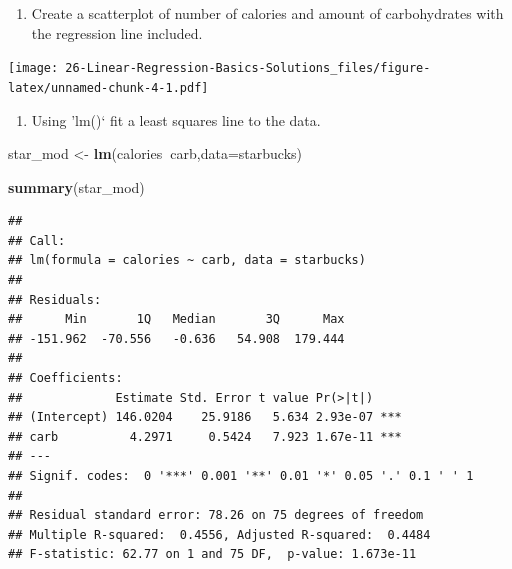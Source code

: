 \documentclass[
]{book}
\newenvironment{Shaded}{\begin{snugshade}}{\end{snugshade}}
\newcommand{\DataTypeTok}[1]{\textcolor[rgb]{0.13,0.29,0.53}{#1}}
\newcommand{\KeywordTok}[1]{\textcolor[rgb]{0.13,0.29,0.53}{\textbf{#1}}}
\newcommand{\NormalTok}[1]{#1}
\newcommand{\OperatorTok}[1]{\textcolor[rgb]{0.81,0.36,0.00}{\textbf{#1}}}
\newcommand{\StringTok}[1]{\textcolor[rgb]{0.31,0.60,0.02}{#1}}
\providecommand{\tightlist}{%
  \setlength{\itemsep}{0pt}\setlength{\parskip}{0pt}}
\begin{document}
\begin{enumerate}
\def\labelenumi{\alph{enumi}.}
\setcounter{enumi}{4}
\tightlist
\item
  Create a scatterplot of number of calories and amount of carbohydrates with the regression line included.
\end{enumerate}

\begin{Shaded}
\end{Shaded}

\texttt{[image: 26-Linear-Regression-Basics-Solutions\_files/figure-latex/unnamed-chunk-4-1.pdf]}

\begin{enumerate}
\def\labelenumi{\alph{enumi}.}
\setcounter{enumi}{5}
\tightlist
\item
  Using 'lm()` fit a least squares line to the data.
\end{enumerate}

\begin{Shaded}
\begin{Highlighting}[]
\NormalTok{star_mod <-}\StringTok{ }\KeywordTok{lm}\NormalTok{(calories}\OperatorTok{~}\NormalTok{carb,}\DataTypeTok{data=}\NormalTok{starbucks)}
\end{Highlighting}
\end{Shaded}

\begin{Shaded}
\begin{Highlighting}[]
\KeywordTok{summary}\NormalTok{(star_mod)}
\end{Highlighting}
\end{Shaded}

\begin{verbatim}
## 
## Call:
## lm(formula = calories ~ carb, data = starbucks)
## 
## Residuals:
##      Min       1Q   Median       3Q      Max 
## -151.962  -70.556   -0.636   54.908  179.444 
## 
## Coefficients:
##             Estimate Std. Error t value Pr(>|t|)    
## (Intercept) 146.0204    25.9186   5.634 2.93e-07 ***
## carb          4.2971     0.5424   7.923 1.67e-11 ***
## ---
## Signif. codes:  0 '***' 0.001 '**' 0.01 '*' 0.05 '.' 0.1 ' ' 1
## 
## Residual standard error: 78.26 on 75 degrees of freedom
## Multiple R-squared:  0.4556, Adjusted R-squared:  0.4484 
## F-statistic: 62.77 on 1 and 75 DF,  p-value: 1.673e-11
\end{verbatim}
\end{document}
